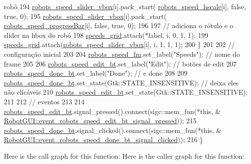 \begin{DoxyCode}
{       robô}
194         \hyperlink{class_robot_g_u_i_a0e88bd14baea3275ab923b4cb5fab40d}{robots\_speed\_slider\_vbox}[i].pack\_start(
      \hyperlink{class_robot_g_u_i_a25c9dbce938a0b6fa4de5c7174d062af}{robots\_speed\_hscale}[i], \textcolor{keyword}{false}, \textcolor{keyword}{true}, 0);
195         \hyperlink{class_robot_g_u_i_a0e88bd14baea3275ab923b4cb5fab40d}{robots\_speed\_slider\_vbox}[i].pack\_start(
      \hyperlink{class_robot_g_u_i_a2c5103a4c119635536213e8c9dd6fc3f}{robots\_speed\_progressBar}[i], \textcolor{keyword}{false}, \textcolor{keyword}{true}, 0);
196 
197         \textcolor{comment}{// adiciona o rótulo e o slider na hbox do robô}
198         \hyperlink{class_robot_g_u_i_a630a21b85d6a9583f77d0a97a2be66e4}{speeds\_grid}.attach(*label, i, 0, 1, 1);
199         \hyperlink{class_robot_g_u_i_a630a21b85d6a9583f77d0a97a2be66e4}{speeds\_grid}.attach(\hyperlink{class_robot_g_u_i_a0e88bd14baea3275ab923b4cb5fab40d}{robots\_speed\_slider\_vbox}[i], i, 1, 1, 1);
200     \}
201 
202     \textcolor{comment}{// configuração inicial}
203 
204     \hyperlink{class_robot_g_u_i_a13eebe1d64530f8cb3454f78589bb4ce}{robots\_speed\_fm}.set\_label(\textcolor{stringliteral}{"Speeds"}); \textcolor{comment}{// nome do frame}
205 
206     \hyperlink{class_robot_g_u_i_aeb9008eb20d42d90fe39564179598d6d}{robots\_speed\_edit\_bt}.set\_label(\textcolor{stringliteral}{"Edit"}); \textcolor{comment}{// botões de edit}
207     \hyperlink{class_robot_g_u_i_accc677ab2d9cd534389956e6d41ee55c}{robots\_speed\_done\_bt}.set\_label(\textcolor{stringliteral}{"Done"}); \textcolor{comment}{// e done}
208 
209     \hyperlink{class_robot_g_u_i_accc677ab2d9cd534389956e6d41ee55c}{robots\_speed\_done\_bt}.set\_state(Gtk::STATE\_INSENSITIVE); \textcolor{comment}{// deixa eles não clicáveis}
210     \hyperlink{class_robot_g_u_i_aeb9008eb20d42d90fe39564179598d6d}{robots\_speed\_edit\_bt}.set\_state(Gtk::STATE\_INSENSITIVE);
211 
212     \textcolor{comment}{// eventos}
213 
214     \hyperlink{class_robot_g_u_i_aeb9008eb20d42d90fe39564179598d6d}{robots\_speed\_edit\_bt}.signal\_pressed().connect(sigc::mem\_fun(*\textcolor{keyword}{this}, &
      \hyperlink{class_robot_g_u_i_ad3e49c942794d65e38600e7d48681fa1}{RobotGUI::event\_robots\_speed\_edit\_bt\_signal\_pressed}));
215     \hyperlink{class_robot_g_u_i_accc677ab2d9cd534389956e6d41ee55c}{robots\_speed\_done\_bt}.signal\_clicked().connect(sigc::mem\_fun(*\textcolor{keyword}{this}, &
      \hyperlink{class_robot_g_u_i_a7acb7bdc8533f946f2cbea74966147cc}{RobotGUI::event\_robots\_speed\_done\_bt\_signal\_clicked}));
216 \}
\end{DoxyCode}
Here is the call graph for this function\+:
Here is the caller graph for this function\+:
\mbox{\label{class_robot_g_u_i_aaed4d5a44833dc435ac8f9e2faad58b7}} 
